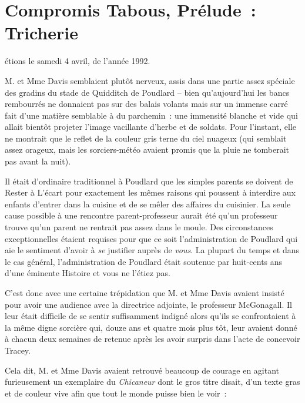 \chapter{Compromis Tabous, Prélude~: Tricherie}

 étions le samedi 4 avril, de l'année 1992.

\hplettrineextrapara
M. et Mme Davis semblaient plutôt nerveux, assis dans une partie assez spéciale des gradins du stade de Quidditch de Poudlard -- bien qu'aujourd'hui les bancs rembourrés ne donnaient pas sur des balais volants mais sur un immense carré fait d'une matière semblable à du parchemin~: une immensité blanche et vide qui allait bientôt projeter l'image vacillante d'herbe et de soldats. Pour l'instant, elle ne montrait que le reflet de la couleur gris terne du ciel nuageux (qui semblait assez orageux, mais les sorciers-météo avaient promis que la pluie ne tomberait pas avant la nuit).

Il était d'ordinaire traditionnel à Poudlard que les simples parents se doivent de Rester à L'écart pour exactement les mêmes raisons qui poussent à interdire aux enfants d'entrer dans la cuisine et de se mêler des affaires du cuisinier. La seule cause possible à une rencontre parent-professeur aurait été qu'un professeur trouve qu'un parent ne rentrait pas assez dans le moule. Des circonstances exceptionnelles étaient requises pour que ce soit l'administration de Poudlard qui aie le sentiment d'avoir à \emph{se} justifier auprès de \emph{vous}. La plupart du temps et dans le cas général, l'administration de Poudlard était soutenue par huit-cents ans d'une éminente Histoire et vous ne l'étiez pas.

C'est donc avec une certaine trépidation que M. et Mme Davis avaient insisté pour avoir une audience avec la directrice adjointe, le professeur McGonagall. Il leur était difficile de se sentir suffisamment indigné alors qu'ils se confrontaient à la même digne sorcière qui, douze ans et quatre mois plus tôt, leur avaient donné à chacun deux semaines de retenue après les avoir surpris dans l'acte de concevoir Tracey.

Cela dit, M. et Mme Davis avaient retrouvé beaucoup de courage en agitant furieusement un exemplaire du \emph{Chicaneur} dont le gros titre disait, d'un texte gras et de couleur vive afin que tout le monde puisse bien le voir~:


